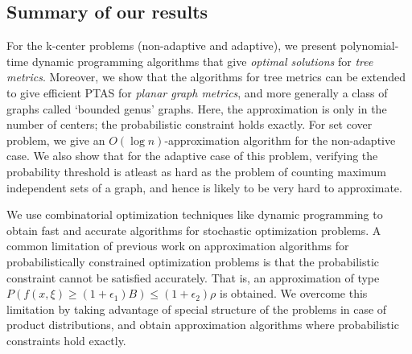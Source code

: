 \documentclass[11pt,onecolumn]{article}
\newcommand{\newtext}[1]{{#1}}
\begin{document}
\subsection{Summary of our results}
For the k-center problems (non-adaptive and adaptive), we present polynomial-time dynamic programming algorithms that give {\it optimal solutions} for {\it tree metrics}. Moreover, we show that the algorithms for tree metrics can be extended to give efficient PTAS for {\it planar graph metrics}, and more generally a class of graphs called `bounded genus' graphs. Here, the approximation is only in the number of centers; the probabilistic constraint holds exactly. For set cover problem, we give an $O(\log n)$-approximation algorithm for the non-adaptive case. We also show that for the adaptive case of this problem, verifying the probability threshold is atleast as hard as the problem of counting maximum independent sets of a graph, and hence is likely to be very hard to approximate. 

\newtext{We use combinatorial optimization techniques like dynamic programming to obtain fast and accurate algorithms for stochastic optimization problems. A common limitation of previous work \cite{goel99stochastic, swamy-risk-averse} on approximation algorithms for probabilistically constrained optimization problems is that the probabilistic constraint cannot be satisfied accurately. That is, an approximation of type $P(f(x,\xi) \ge (1+\epsilon_1) B) \le (1+\epsilon_2) \rho$ is obtained. We overcome this limitation by taking advantage of special structure of the problems in case of product distributions, and obtain approximation algorithms where probabilistic constraints hold exactly.}
\end{document}
